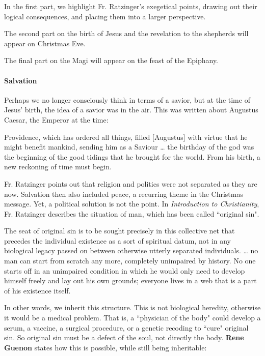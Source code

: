 In the first part, we highlight Fr. Ratzinger's exegetical points, drawing out their logical consequences, and placing them into a larger perspective.

The second part on the birth of Jesus and the revelation to the shepherds will appear on Christmas Eve.

The final part on the Magi will appear on the feast of the Epiphany.

\paragraph{Salvation}
Perhaps we no longer consciously think in terms of a savior, but at the time of Jesus' birth, the idea of a savior was in the air. This was written about Augustus Caesar, the Emperor at the time:

\begin{quotex}
Providence, which has ordered all things, filled [Augustus] with virtue that he might benefit mankind, sending him as a Saviour … the birthday of the god was the beginning of the good tidings that he brought for the world. From his birth, a new reckoning of time must begin. 

\end{quotex}
Fr. Ratzinger points out that religion and politics were not separated as they are now. Salvation then also included peace, a recurring theme in the Christmas message. Yet, a political solution is not the point. In \emph{Introduction to Christianity}, Fr. Ratzinger describes the situation of man, which has been called ``original sin".

\begin{quotex}
The seat of original sin is to be sought precisely in this collective net that precedes the individual existence as a sort of spiritual datum, not in any biological legacy passed on between otherwise utterly separated individuals. … no man can start from scratch any more, completely unimpaired by history. No one starts off in an unimpaired condition in which he would only need to develop himself freely and lay out his own grounds; everyone lives in a web that is a part of his existence itself. 

\end{quotex}
In other words, we inherit this structure. This is not biological heredity, otherwise it would be a medical problem. That is, a ``physician of the body" could develop a serum, a vaccine, a surgical procedure, or a genetic recoding to ``cure" original sin. So original sin must be a defect of the soul, not directly the body. \textbf{Rene Guenon} states how this is possible, while still being inheritable:

